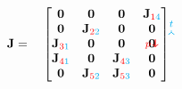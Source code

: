%

\begin{equation}\label{eq:JacobianExample}
	\mf{J}=\quad
	\begin{bmatrix}
		\tikzmark{J_topleft}\mf{0} & 
		\mf{0} & \mf{0} & \mf{J}_{\rr{1}\cc{4}}\tikzmark{J_topright}\\		
		\mf{0} & \mf{J}_{\rr{2}\cc{2}} & \mf{0} & \mf{0}\\
		\mf{J}_{\rr{3}\cc{1}} & \mf{0} & \mf{0} & \mf{0}\\
		\mf{J}_{\rr{4}\cc{1}} & \mf{0} & \mf{J}_{\rr{4}\cc{3}} & \mf{0}\\
		\tikzmark{J_bottomleft}
		\mf{0} & \mf{J}_{\rr{5}\cc{2}} & \mf{J}_{\rr{5}\cc{3}} & \mf{0}		
	\end{bmatrix}
\tikz[overlay,remember picture] {
	\draw[->,thick,color=cyan]
  ([yshift=3ex]J_topleft) -- ([yshift=3ex]J_topright) node[midway,above]
  {\scriptsize $t$}; 
  \draw[->,thick,color=red]
  ([yshift=1.5ex,xshift=-3ex]J_topleft) -- ([xshift=-3ex]J_bottomleft)
  node[near end,left] {\scriptsize $p$};}	
\end{equation}

